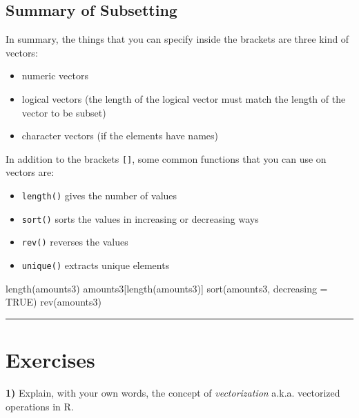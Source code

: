 \documentclass[
]{book}
\newenvironment{Shaded}{\begin{snugshade}}{\end{snugshade}}
\newcommand{\AttributeTok}[1]{\textcolor[rgb]{0.77,0.63,0.00}{#1}}
\newcommand{\ConstantTok}[1]{\textcolor[rgb]{0.00,0.00,0.00}{#1}}
\newcommand{\FunctionTok}[1]{\textcolor[rgb]{0.00,0.00,0.00}{#1}}
\newcommand{\NormalTok}[1]{#1}
\providecommand{\tightlist}{%
  \setlength{\itemsep}{0pt}\setlength{\parskip}{0pt}}
\begin{document}
\hypertarget{summary-of-subsetting}{%
\subsection{Summary of Subsetting}\label{summary-of-subsetting}}

In summary, the things that you can specify inside the brackets are three
kind of vectors:

\begin{itemize}
\item
  numeric vectors
\item
  logical vectors (the length of the logical vector must match the length
  of the vector to be subset)
\item
  character vectors (if the elements have names)
\end{itemize}

In addition to the brackets \texttt{{[}{]}}, some common functions that you can use on
vectors are:

\begin{itemize}
\tightlist
\item
  \texttt{length()} gives the number of values
\item
  \texttt{sort()} sorts the values in increasing or decreasing ways
\item
  \texttt{rev()} reverses the values
\item
  \texttt{unique()} extracts unique elements
\end{itemize}

\begin{Shaded}
\begin{Highlighting}[]
\FunctionTok{length}\NormalTok{(amounts3)}
\NormalTok{amounts3[}\FunctionTok{length}\NormalTok{(amounts3)]}
\FunctionTok{sort}\NormalTok{(amounts3, }\AttributeTok{decreasing =} \ConstantTok{TRUE}\NormalTok{)}
\FunctionTok{rev}\NormalTok{(amounts3)}
\end{Highlighting}
\end{Shaded}

\begin{center}\rule{0.5\linewidth}{0.5pt}\end{center}

\hypertarget{exercises-3}{%
\section{Exercises}\label{exercises-3}}

\textbf{1)} Explain, with your own words, the concept of \emph{vectorization} a.k.a.
vectorized operations in R.
\end{document}
